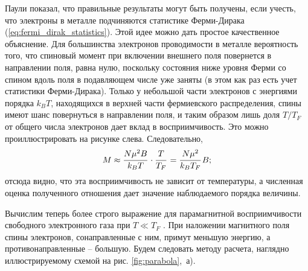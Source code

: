 \documentclass[a4paper, 12pt, openany]{book}
\begin{document}
    Паули показал, что правильные результаты могут быть получены, если учесть, что электроны в металле подчиняются статистике Ферми-Дирака (\ref{eq:fermi_dirak_statistics}).
    Этой идее можно дать простое качественное объяснение.
    Для большинства электронов проводимости в металле вероятность того, что спиновый момент при включении внешнего поля повернется в направлении поля, равна нулю, поскольку состояния ниже уровня Ферми со спином вдоль поля в подавляющем числе уже заняты (в этом как раз есть учет статистики Ферми-Дирака).
    Только у небольшой части электронов с энергиями порядка $k_BT$, находящихся в верхней части фермиевского распределения, спины имеют шанс повернуться в направлении поля, и таким образом лишь доля $T/T_F$  от общего числа электронов дает вклад в восприимчивость.
    Это можно проиллюстрировать на рисунке слева.
    Следовательно,
    \begin{equation}
        M \approx \cfrac{N \mu^2 B}{k_{B}T}\, \cdot \cfrac{T}{T_F}\, = \cfrac{N \mu^2}{k_{B}T_{F}}\, B;
        \label{eq:M_pauli_approx}
    \end{equation}
    отсюда видно, что эта восприимчивость не зависит от температуры, а численная оценка полученного отношения дает значение наблюдаемого порядка величины.

    Вычислим теперь более строго выражение для парамагнитной восприимчивости свободного электронного газа при $T \ll T_{F}$ .
    При наложении магнитного поля спины электронов, сонаправленные с ним, примут меньшую энергию, а противонаправленные -- большую. Будем следовать методу расчета, наглядно иллюстрируемому схемой на рис. \ref{fig:parabola},~а).
\end{document}

